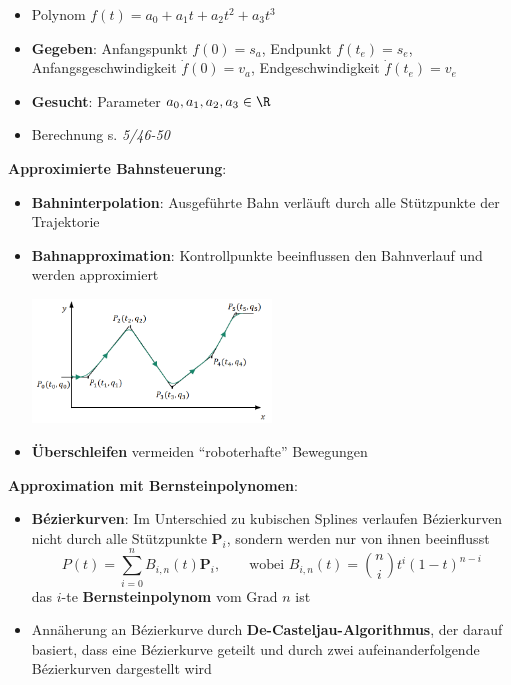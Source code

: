 \begin{itemize}
	\item Polynom $f(t)=a_0+a_1 t+a_2t^2+a_3t^3$
	\item \textbf{Gegeben}: Anfangspunkt $f(0)=s_a$, Endpunkt $f(t_e)=s_e$, Anfangsgeschwindigkeit $\dot{f}(0)=v_a$, Endgeschwindigkeit $\dot{f}(t_e)=v_e$
	\item \textbf{Gesucht}: Parameter $a_0,a_1,a_2,a_3\in\R$
	\item Berechnung s. \textit{5/46-50}
\end{itemize}
\bigskip
\textbf{Approximierte Bahnsteuerung}:
\begin{itemize}
	\item \textbf{Bahninterpolation}: Ausgeführte Bahn verläuft durch alle Stützpunkte der Trajektorie
	\item \textbf{Bahnapproximation}: Kontrollpunkte beeinflussen den Bahnverlauf und werden approximiert
	\begin{center}
		\includegraphics[width=0.5\textwidth]{images/approx.png}
	\end{center}
	\item \textbf{Überschleifen} vermeiden \enquote{roboterhafte} Bewegungen
\end{itemize}
\bigskip
\textbf{Approximation mit Bernsteinpolynomen}:
\begin{itemize}
	\item \textbf{Bézierkurven}: Im Unterschied zu kubischen Splines verlaufen Bézierkurven nicht durch alle Stützpunkte $\mathbf{P}_i$, sondern werden nur von ihnen beeinflusst
	$$P(t)=\sum\limits_{i=0}^{n} B_{i,n}(t)\mathbf{P}_i, \qquad \text{wobei } B_{i,n}(t)={n \choose i}t^i (1-t)^{n-i}$$
	das $i$-te \textbf{Bernsteinpolynom} vom Grad $n$ ist
	\item Annäherung an Bézierkurve durch \textbf{De-Casteljau-Algorithmus}, der darauf basiert, dass eine Bézierkurve geteilt und durch zwei aufeinanderfolgende Bézierkurven dargestellt wird
\end{itemize}
